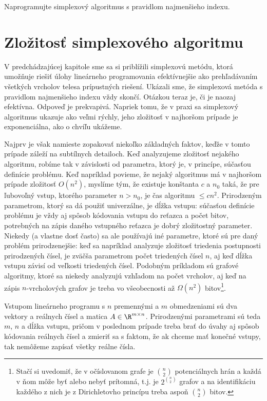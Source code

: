 \begin{prob}
  Naprogramujte simplexový algoritmus s pravidlom najmenšieho indexu.
\end{prob}

\section{Zložitosť simplexového algoritmu}

\noindent
V predchádzajúcej kapitole sme sa si priblížili simplexovú metódu, ktorá umožňuje 
riešiť úlohy lineárneho programovania efektívnejšie ako prehľadávaním všetkých vrcholov telesa prípustných riešení.
Ukázali sme, že simplexová metóda s pravidlom najmenšieho indexu vždy skončí. Otázkou teraz je, či je
naozaj efektívna. Odpoveď je prekvapivá. Napriek tomu, že v praxi sa simplexový algoritmus ukazuje 
ako veľmi rýchly, jeho zložitosť v najhoršom prípade je exponenciálna, ako o chvíľu ukážeme.

\noindent
Najprv je však namieste zopakovať niekoľko základných faktov, keďže v tomto prípade záleží na subtílnych 
detailoch. Keď analyzujeme zložitosť nejakého algoritmu, 
robíme tak v závislosti od  parametra, ktorý je, v princípe,
súčasťou definície problému. Keď napríklad povieme, že nejaký algoritmus má v najhoršom 
prípade zložitosť $O(n^2)$, myslíme tým,
že existuje konštanta $c$ a $n_0$ taká, že pre ľubovoľný vstup, ktorého parameter $n>n_0$, je čas
algoritmu $\le cn^2$. Prirodzeným parametrom, ktorý sa dá použiť univerzálne, je dĺžka vstupu: súčasťou
definície problému je vždy aj spôsob kódovania vstupu do reťazca a počet bitov, potrebných na zápis 
daného vstupného reťazca je dobrý zložitostný parameter. Niekedy (a vlastne dosť často) sa ale používajú
iné parametre, ktoré sú pre daný problém prirodzenejšie: keď sa napríklad analyzuje zložitosť triedenia
postupnosti prirodzených čísel, je zväčša parametrom počet triedených čísel $n$, aj keď dĺžka vstupu závisí od 
veľkosti triedených čísel. Podobným príkladom sú grafové algoritmy, ktoré sa niekedy analyzujú vzhľadom na
počet vrcholov, aj keď na zápis $n$-vrcholových grafov je treba vo všeobecnosti až $\Omega(n^2)$ 
bitov\footnote{Stačí si uvedomiť, že v očíslovanom grafe je ${n\choose 2}$ potenciálnych hrán
  a každá v ňom môže byť alebo nebyť prítomná, t.j. je $2^{n\choose 2}$ grafov a na identifikáciu 
každého z nich je z Dirichletovho princípu treba aspoň $n\choose 2$ bitov.}.

\noindent
Vstupom lineárneho programu s $n$ premennými a $m$ obmedzeniami sú dva vektory  a  reálnych čísel
a matica $A\in\R^{m\times n}$. Prirodzenými parametrami sú teda $m$, $n$ a dĺžka vstupu, pričom v poslednom
prípade treba brať do úvahy aj spôsob kódovania reálnych čísel a zmieriť sa s faktom, že ak chceme mať konečné vstupy,
tak nemôžeme zapísať všetky reálne čísla. 

